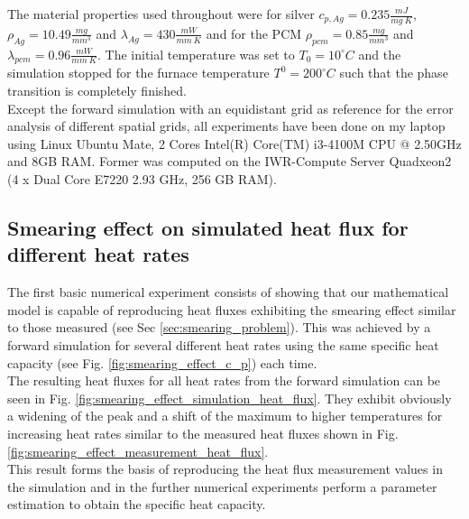 \documentclass{scrartcl}[12pt, halfparskip]
\begin{document}
The material properties used throughout were for silver $c_{p,Ag}=0.235 \frac{mJ}{mg \ K}$, $\rho_{Ag}=10.49 \frac{mg}{mm^3}$ and $\lambda_{Ag}=430 \frac{mW}{mm \ K}$ and for the PCM $\rho_{pcm}=0.85 \frac{mg}{mm^3}$ and $\lambda_{pcm}=0.96 \frac{mW}{mm \ K}$. The initial temperature was set to $T_0=10^\circ C$ and the simulation stopped for the furnace temperature $T^0=200^\circ C$ such that the phase transition is completely finished. \\

Except the forward simulation with an equidistant grid as reference for the error analysis of different spatial grids, all experiments have been done on my laptop using Linux Ubuntu Mate, 2 Cores Intel(R) Core(TM) i3-4100M CPU @ 2.50GHz and 8GB RAM. Former was computed on the IWR-Compute Server Quadxeon2 (4 x Dual Core E7220 2.93 GHz, 256 GB RAM).


\subsection{Smearing effect on simulated heat flux for different heat rates}
The first basic numerical experiment consists of showing that our mathematical model is capable of reproducing heat fluxes exhibiting the smearing effect similar to those measured (see Sec \ref{sec:smearing_problem}). This was achieved by a forward simulation for several different heat rates using  the same specific heat capacity (see Fig. \ref{fig:smearing_effect_c_p}) each time. \\
The resulting heat fluxes for all heat rates from the forward simulation can be seen in Fig. \ref{fig:smearing_effect_simulation_heat_flux}. They exhibit obviously a widening of the peak and a shift of the maximum to higher temperatures for increasing heat rates similar to the measured heat fluxes shown in Fig. \ref{fig:smearing_effect_measurement_heat_flux}. \\
This result forms the basis of reproducing the heat flux measurement values in the simulation and in the further numerical experiments perform a parameter estimation to obtain the specific heat capacity. 
\end{document}
